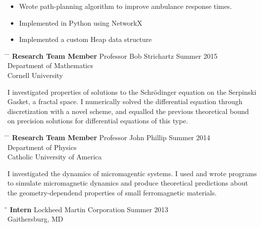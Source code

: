 \documentclass[12pt]{res}
\begin{document}
\begin{resume}
	\vspace{-45pt}
	\begin{itemize}
	\item Wrote path-planning algorithm to improve ambulance response times.
	\vspace{-10pt}
	\item Implemented in Python using NetworkX
	\vspace{-10pt}
	\item Implemented a custom Heap data structure
	\end{itemize}
    
    \vspace{5pt}
    \begin{tabbing}
      \hspace{2.3in} \= \hspace{2.6in} \= \kill
      {\bf Research Team Member} \> Professor Bob Strichartz  \> Summer 2015 \\
		\> Department of Mathematics\\
		\> Cornell University \\
    \end{tabbing}\vspace{-30pt}	

	\noindent
	I investigated properties of solutions to the Schrödinger equation on
		the Serpinski Gasket, a fractal space.
	I numerically solved the differential equation through discretization
		with a novel scheme, and equalled the previous theoretical bound
		on precision solutions for differential equations of this type.

	\vspace{5pt}
	\begin{tabbing}
		\hspace{2.3in} \= \hspace{2.6in} \= \kill
		{\bf Research Team Member} \> Professor John Phillip \> Summer 2014 \\
		\> Department of Physics\\
		\> Catholic University of America \\
	\end{tabbing} \vspace{-30pt}

	\noindent
	I investigated the dynamics of micromagentic systems.
	I used and wrote programs to simulate micromagnetic dynamics and produce
		theoretical predictions about the geometry-dependend properties
		of small ferromagnetic materials. 

    \begin{tabbing}
    \hspace{2.3in}\= \hspace{2.6in}\= \kill %
    \textbf{ Intern } \> Lockheed Martin Corporation \> Summer 2013\\
                  \> Gaithersburg, MD
    \end{tabbing}\vspace{-10pt}


\end{resume}
\end{document}
